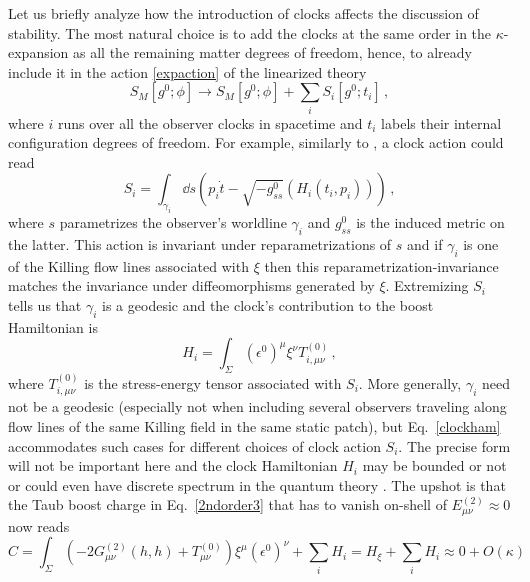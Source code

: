 \documentclass[]{jkpaper}
\theoremstyle{plain}
\theoremstyle{definition}
\begin{document}
Let us briefly analyze how the introduction of clocks affects the discussion of stability. The most natural choice is to add the clocks at the same order in the $\kappa$-expansion as all the remaining matter degrees of freedom, hence, to already include it in the action \eqref{expaction} of the linearized theory
\begin{equation}
    S_M[g^0;\phi]\to S_M[g^0;\phi]+\sum_i S_i[g^0;t_i]\,,
\end{equation}
where $i$ runs over all the observer clocks in spacetime and $t_i$ labels their internal configuration degrees of freedom. For example, similarly to \cite{Witten:2023xze,Kolchmeyer:2024fly}, a clock action could read
\begin{equation}\label{eq: clock worldline action}
S_i=\int_{\gamma_i}\dd s\left(p_i\dot t-\sqrt{-g^0_{ss}}(H_i(t_i,p_i))\right)\,,
\end{equation}
where $s$ parametrizes the observer's worldline $\gamma_i$ and $g^0_{ss}$ is the induced metric on the latter. This action is invariant under reparametrizations of $s$ and if $\gamma_i$ is one of the Killing flow lines associated with $\xi$ then this reparametrization-invariance matches the invariance under diffeomorphisms generated by $\xi$. Extremizing $S_i$ tells us that $\gamma_i$ is a geodesic and the clock's contribution to the boost Hamiltonian is
\begin{equation}\label{clockham}
    H_i=\int_\Sigma (\epsilon^0)^\mu\xi^\nu T^{(0)}_{i,\mu \nu}\,,
\end{equation}
where $T^{(0)}_{i,\mu \nu}$ is the stress-energy tensor associated with $S_i$. More generally, $\gamma_i$ need not be a geodesic (especially not when including several observers  traveling along flow lines of the same Killing field in the same static patch), but Eq.~\eqref{clockham} accommodates such cases for different choices of clock action $S_i$. The precise form will not be important here and the clock Hamiltonian $H_i$ may be bounded or not \cite{Hoehn:2019fsy,Hoehn:2020epv,DVEHK} or could even have discrete spectrum in the quantum theory \cite{Chataignier:2024eil}. The upshot is that the Taub boost charge in Eq.~\eqref{2ndorder3} that has to vanish on-shell of $E^{(2)}_{\mu \nu}\approx0$ now reads
\begin{equation}\label{taub1}
C=\int_\Sigma\left(-2G^{(2)}_{\mu \nu}(h,h)+T_{\mu \nu}^{(0)}\right)\xi^\mu(\epsilon^0)^\nu+\sum_i H_i=H_\xi+\sum_i H_i\approx0+O(\kappa)\,
\end{equation}
\end{document}
